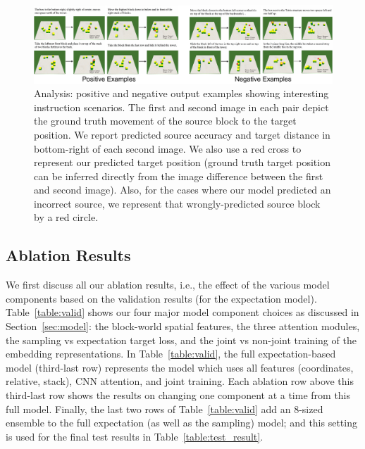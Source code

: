 \documentclass[letterpaper]{article} %
\begin{document}
\begin{figure}[ht!]
\centering
\includegraphics[width=0.99\linewidth]{wide_pdf.pdf}
\caption{Analysis: positive and negative output examples showing interesting instruction scenarios. The first and second image in each pair depict the ground truth movement of the source block to the target position. We report predicted source accuracy and target distance in bottom-right of each second image. We also use a red cross to represent our predicted target position (ground truth target position can be inferred directly from the image difference between the first and second image). Also, for the cases where our model predicted an incorrect source, we represent that wrongly-predicted source block by a red circle.
}
\label{fig:examples}
\end{figure}

\subsection{Ablation Results}
\label{sec:val}
We first discuss all our ablation results, i.e., the effect of the various model components based on the validation results (for the expectation model). Table~\ref{table:valid} shows our four major model component choices as discussed in Section~\ref{sec:model}: the block-world spatial features, the three attention modules, the sampling vs expectation target loss, and the joint vs non-joint training of the embedding representations.  In Table~\ref{table:valid}, the full expectation-based model (third-last row) represents the model which uses all features (coordinates, relative, stack), CNN attention, and joint training. Each ablation row above this third-last row shows the results on changing one component at a time from this full model. Finally, the last two rows of Table~\ref{table:valid} add an 8-sized ensemble to the full expectation (as well as the sampling) model; and this setting is used for the final test results in Table~\ref{table:test_result}.
\end{document}
